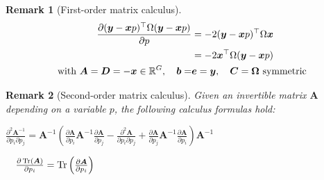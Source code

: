 \documentclass[pdflatex, sn-nature]{sn-jnl}
\theoremstyle{thmstyleone}%
\theoremstyle{thmstyletwo}%
\newtheorem{remark}{Remark}%
\theoremstyle{thmstylethree}%
\begin{document}
\begin{appendices}
\begin{remark}[First-order matrix calculus]
            \begin{equation*}
                \begin{split}
                    \frac{\partial (\boldsymbol{y}- \boldsymbol{x}p)^{\top} \Omega
                    (\boldsymbol{y}- \boldsymbol{x}p)}{\partial p}&= -2 (\boldsymbol
                    {y}- \boldsymbol{x}p)^{\top} \Omega \boldsymbol{x}\\
                    &= -2 \boldsymbol{x}^{\top} \Omega (\boldsymbol{y}- \boldsymbol
                    {x}p) \\
                    \text{ with }\boldsymbol{A}= \boldsymbol{D}= - \boldsymbol{x}
                    \in \mathbb{R}^{G}, \quad \boldsymbol{b}=&\boldsymbol{e}= \boldsymbol
                    {y}, \quad \boldsymbol{C}= \boldsymbol{\Omega}\text{ symmetric}
                \end{split}
            \end{equation*}
        \end{remark}


        \begin{remark}[Second-order matrix calculus]
            \label{pr:matrix-calculus-second-order} Given an invertible matrix $\boldsymbol
            {A}$ depending on a variable $p$, the following calculus formulas
            hold:

            \begin{enumerate}[label=(\alph{*})]
                \begin{minipage}[c]{0.7\linewidth}
                    \item $\frac{\partial^{2} \boldsymbol{A}^{-1}}{\partial p_{i}
                    \partial p_{j}}= \boldsymbol{A}^{-1}\left( \frac{\partial
                    \boldsymbol{A}}{\partial p_{i} }\boldsymbol{A}^{-1}\frac{\partial
                    \boldsymbol{A}}{\partial p_{j}}- \frac{\partial^{2} \boldsymbol{A}}{\partial
                    p_{i} \partial p_{j}}+ \frac{\partial \boldsymbol{A}}{\partial
                    p_{j} }\boldsymbol{A}^{-1}\frac{\partial \boldsymbol{A}}{\partial
                    p_{i}}\right) \boldsymbol{A}^{-1}\quad$
                \end{minipage}
                \begin{minipage}[c]{0.25\linewidth}
                    \item $\quad \frac{\partial \operatorname*{Tr} \left(\boldsymbol{A}\right)}{\partial
                    p_{i}}= \operatorname*{Tr} \left(\frac{\partial \boldsymbol{A}}{\partial p_{i}}
                    \right)$
                \end{minipage}
            \end{enumerate}


\end{remark}
\end{appendices}
\end{document}
